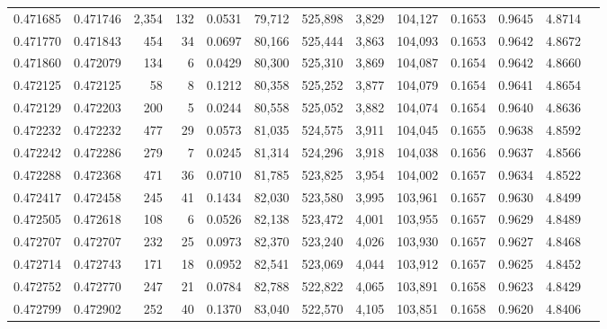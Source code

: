 \begin{tabular}{rrrrrrrrrrrrr}
0.471685 & 0.471746 & 2,354 &   132 &                                     0.0531 &  79,712 & 525,898 &   3,829 & 104,127 & 0.1653 & 0.9645 & 4.8714 \\
0.471770 & 0.471843 &   454 &    34 &                                     0.0697 &  80,166 & 525,444 &   3,863 & 104,093 & 0.1653 & 0.9642 & 4.8672 \\
0.471860 & 0.472079 &   134 &     6 &                                     0.0429 &  80,300 & 525,310 &   3,869 & 104,087 & 0.1654 & 0.9642 & 4.8660 \\
0.472125 & 0.472125 &    58 &     8 &                                     0.1212 &  80,358 & 525,252 &   3,877 & 104,079 & 0.1654 & 0.9641 & 4.8654 \\
0.472129 & 0.472203 &   200 &     5 &                                     0.0244 &  80,558 & 525,052 &   3,882 & 104,074 & 0.1654 & 0.9640 & 4.8636 \\
0.472232 & 0.472232 &   477 &    29 &                                     0.0573 &  81,035 & 524,575 &   3,911 & 104,045 & 0.1655 & 0.9638 & 4.8592 \\
0.472242 & 0.472286 &   279 &     7 &                                     0.0245 &  81,314 & 524,296 &   3,918 & 104,038 & 0.1656 & 0.9637 & 4.8566 \\
0.472288 & 0.472368 &   471 &    36 &                                     0.0710 &  81,785 & 523,825 &   3,954 & 104,002 & 0.1657 & 0.9634 & 4.8522 \\
0.472417 & 0.472458 &   245 &    41 &                                     0.1434 &  82,030 & 523,580 &   3,995 & 103,961 & 0.1657 & 0.9630 & 4.8499 \\
0.472505 & 0.472618 &   108 &     6 &                                     0.0526 &  82,138 & 523,472 &   4,001 & 103,955 & 0.1657 & 0.9629 & 4.8489 \\
0.472707 & 0.472707 &   232 &    25 &                                     0.0973 &  82,370 & 523,240 &   4,026 & 103,930 & 0.1657 & 0.9627 & 4.8468 \\
0.472714 & 0.472743 &   171 &    18 &                                     0.0952 &  82,541 & 523,069 &   4,044 & 103,912 & 0.1657 & 0.9625 & 4.8452 \\
0.472752 & 0.472770 &   247 &    21 &                                     0.0784 &  82,788 & 522,822 &   4,065 & 103,891 & 0.1658 & 0.9623 & 4.8429 \\
0.472799 & 0.472902 &   252 &    40 &                                     0.1370 &  83,040 & 522,570 &   4,105 & 103,851 & 0.1658 & 0.9620 & 4.8406 \\

\end{tabular}
